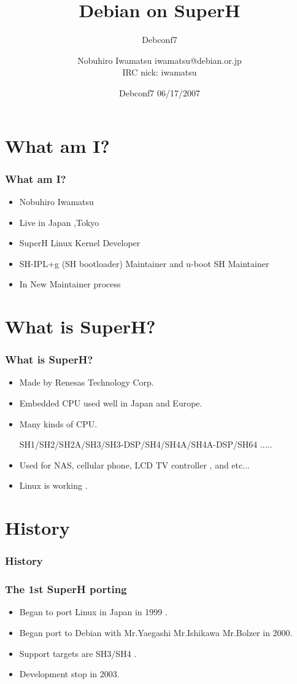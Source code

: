 \documentclass[cjk,dvipdfm,12pt]{beamer}
\title{Debian on SuperH}
\subtitle{Debconf7}
\author{Nobuhiro Iwamatsu iwamatsu@debian.or.jp\\IRC nick: iwamatsu}
\date{Debconf7 06/17/2007}
\begin{document}
\frame{\titlepage{}}

\section{What am I?}

\begin{frame}
 \frametitle{What am I?}
 \begin{itemize}
  \item Nobuhiro Iwamatsu
  \item Live in Japan ,Tokyo
  \item SuperH Linux Kernel Developer
  \item SH-IPL+g (SH bootloader) Maintainer and u-boot SH Maintainer
  \item In New Maintainer process
    
 \end{itemize}
\end{frame}


\section{What is SuperH?}

\begin{frame}
 \frametitle{What is SuperH?}
 \begin{itemize}
  \item Made by Renesas Technology Corp.
  \item Embedded CPU used well in Japan and Europe.
  \item Many kinds of CPU.
  
	SH1/SH2/SH2A/SH3/SH3-DSP/SH4/SH4A/SH4A-DSP/SH64 .....

  \item Used for NAS, cellular phone, LCD TV controller , and etc...
  \item Linux is working .
    
 \end{itemize}
\end{frame}

\section{History}

\begin{frame}
 \frametitle{History}
 
\end{frame}

\begin{frame}
 \frametitle{The 1st SuperH porting}
  \begin{itemize}
    \item Began to port Linux in Japan in 1999 .
    \item Began port to Debian with Mr.Yaegashi Mr.Ishikawa Mr.Bolzer in 2000.
    \item Support targets are SH3/SH4 .
    \item Development stop in 2003. 
  \end{itemize}
\end{frame}
\end{document}
